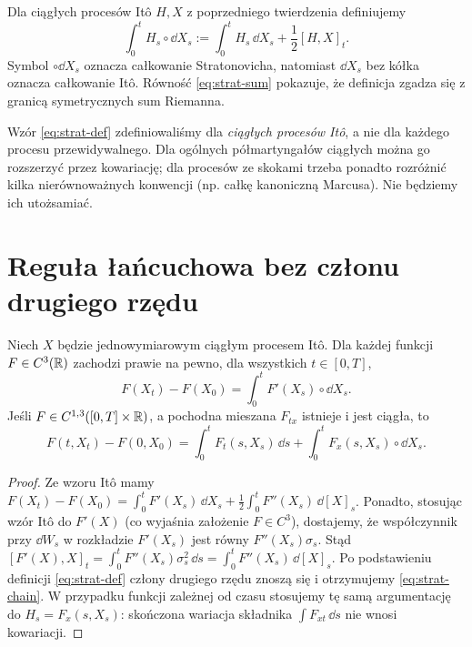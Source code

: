 \begin{definicja}
Dla ciągłych procesów Itô $H,X$ z poprzedniego
twierdzenia definiujemy
\[
\int_0^tH_s\circ\dd X_s
:=\int_0^tH_s\,\dd X_s+\frac12[H,X]_t.
\tag{4.4}\label{eq:strat-def}
\]
Symbol $\circ\dd X_s$ oznacza całkowanie
Stratonovicha, natomiast $\dd X_s$ bez kółka
oznacza całkowanie Itô. Równość
\eqref{eq:strat-sum} pokazuje, że definicja zgadza
się z granicą symetrycznych sum Riemanna.
\end{definicja}

\begin{uwaga}
Wzór \eqref{eq:strat-def} zdefiniowaliśmy dla
\emph{ciągłych procesów Itô}, a nie dla każdego
procesu przewidywalnego. Dla ogólnych
półmartyngałów ciągłych można go rozszerzyć przez
kowariację; dla procesów ze skokami trzeba ponadto
rozróżnić kilka nierównoważnych konwencji (np.
całkę kanoniczną Marcusa). Nie będziemy ich utożsamiać.
\end{uwaga}

\section{Reguła łańcuchowa bez członu drugiego rzędu}
\begin{twierdzenie}
\label{th:strat-chain}
Niech $X$ będzie jednowymiarowym ciągłym procesem
Itô. Dla każdej funkcji $F\in C^3(\mathbb{R})$ zachodzi
prawie na pewno, dla wszystkich $t\in[0,T]$,
\[
F(X_t)-F(X_0)=\int_0^t F'(X_s)\circ\dd X_s.
\tag{4.5}\label{eq:strat-chain}
\]
Jeśli $F\in C^{1,3}([0,T]\times\mathbb{R})$, a pochodna mieszana
$F_{tx}$ istnieje i jest ciągła, to
\[
F(t,X_t)-F(0,X_0)
=\int_0^tF_t(s,X_s)\,\dd s
+\int_0^tF_x(s,X_s)\circ\dd X_s.
\tag{4.6}\label{eq:strat-chain-time}
\]
\end{twierdzenie}
\begin{proof}
Ze wzoru Itô mamy
$F(X_t)-F(X_0)=\int_0^tF'(X_s)\,\dd X_s
+\frac12\int_0^tF''(X_s)\,\dd[X]_s$.
Ponadto, stosując wzór Itô do $F'(X)$
(co wyjaśnia założenie $F\in C^3$),
dostajemy, że współczynnik przy $\dd W_s$ w
rozkładzie $F'(X_s)$ jest równy
$F''(X_s)\sigma_s$. Stąd
$[F'(X),X]_t=\int_0^tF''(X_s)\sigma_s^2\,\dd s
=\int_0^tF''(X_s)\,\dd[X]_s$.
Po podstawieniu definicji \eqref{eq:strat-def}
człony drugiego rzędu znoszą się i otrzymujemy
\eqref{eq:strat-chain}. W przypadku funkcji zależnej
od czasu stosujemy tę samą argumentację do
$H_s=F_x(s,X_s)$: skończona wariacja składnika
$\int F_{xt}\,\dd s$ nie wnosi kowariacji.
\end{proof}

